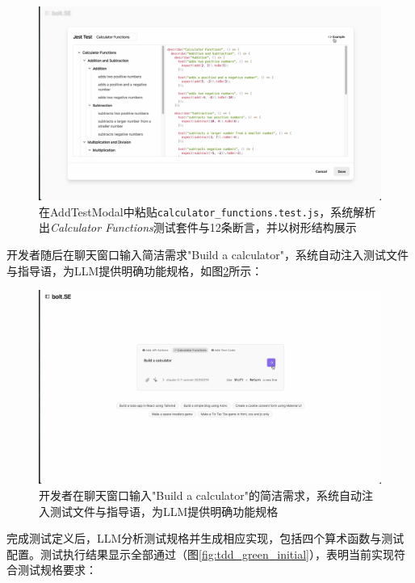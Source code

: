 \begin{figure}[H]
  \centering
  \includegraphics[width=.9\textwidth]{figures/screenshots/tdd/add_test_modal.png}
  \caption{在AddTestModal中粘贴\texttt{calculator\_functions.test.js}，系统解析出\textit{Calculator Functions}测试套件与12条断言，并以树形结构展示}
  \label{fig:tdd_add_test}
\end{figure}

开发者随后在聊天窗口输入简洁需求"Build a calculator"，系统自动注入测试文件与指导语，为LLM提供明确功能规格，如图\ref{fig:tdd_prompt}所示：

\begin{figure}[H]
  \centering
  \includegraphics[width=.9\textwidth]{figures/screenshots/tdd/calculator_prompt.png}
  \caption{开发者在聊天窗口输入"Build a calculator"的简洁需求，系统自动注入测试文件与指导语，为LLM提供明确功能规格}
  \label{fig:tdd_prompt}
\end{figure}

完成测试定义后，LLM分析测试规格并生成相应实现，包括四个算术函数与测试配置。测试执行结果显示全部通过（图\ref{fig:tdd_green_initial}），表明当前实现符合测试规格要求：

